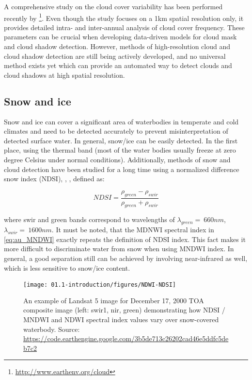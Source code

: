 A comprehensive study on the cloud cover variability has been performed recently by \citep{wilson2016remotely}\footnote{\url{http://www.earthenv.org/cloud}}. Even though the study focuses on a 1km spatial resolution only, it provides detailed intra- and inter-annual analysis of cloud cover frequency. These parameters can be crucial when developing data-driven models for cloud mask and cloud shadow detection. However, methods of high-resolution cloud and cloud shadow detection are still being actively developed, and no universal method exists yet which can provide an automated way to detect clouds and cloud shadows at high spatial resolution. 

\subsection{Snow and ice}

Snow and ice can cover a significant area of waterbodies in temperate and cold climates and need to be detected accurately to prevent misinterpretation of detected surface water. In general, snow/ice can be easily detected. In the first place, using the thermal band (most of the water bodies usually freeze at zero degree Celsius under normal conditions).  Additionally, methods of snow and cloud detection have been studied for a long time using a normalized difference snow index (NDSI), \citep{valovcin1976snow}, \citep{hall1995development}, defined as:

\begin{equation}
NDSI=\frac{\rho_{green}-\rho_{swir}}{\rho_{green}+\rho_{swir}}
\end{equation}

where swir and green bands correspond to wavelengths of $\lambda_{green}=~660nm$, $\lambda_{swir}=~1600nm$. It must be noted, that the MDNWI spectral index in \ref{eq:au_MNDWI} exactly repeats the definition of NDSI index. This fact makes it more difficult to discriminate water from snow when using MNDWI index. In general, a good separation still can be achieved by involving near-infrared as well, which is less sensitive to snow/ice content.

\begin{figure}[H]
	\texttt{[image: 01.1-introduction/figures/NDWI-NDSI]}
	\caption{An example of Landsat 5 image for December 17, 2000 TOA composite image (left: swir1, nir, green) demonstrating how NDSI / MNDWI and NDWI spectral index values vary over snow-covered waterbody. Source: \url{https://code.earthengine.google.com/3b5de713c26202cad46e5ddfc5deb7c2}}
	\label{fig:snow}
\end{figure}

